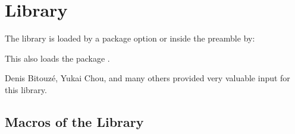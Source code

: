 \clearpage
\section{Library }\label{sec:theorems}%
%
The library is loaded by a package option or inside the preamble by:
\begin{dispListing}
\end{dispListing}
This also loads the package .

Denis Bitouz\'e, Yukai Chou, and many others provided very valuable input for this library.


\subsection{Macros of the Library}

